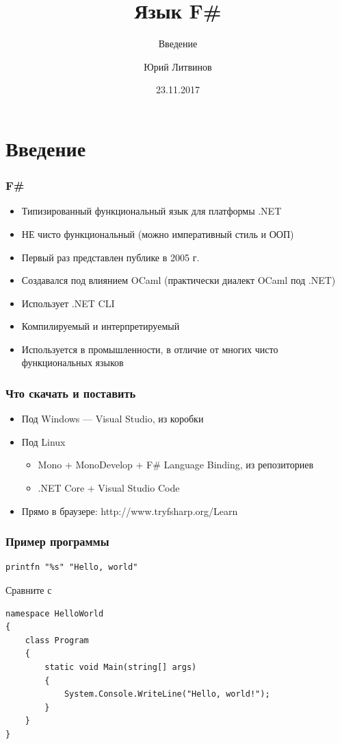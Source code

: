 \documentclass[xetex,mathserif,serif]{beamer}
\title{Язык F\#}
\subtitle{Введение}
\author{Юрий Литвинов}
\date{23.11.2017}
\begin{document}
	
	\frame{\titlepage}

	\section{Введение}

	\begin{frame}
		\frametitle{F\#}
		\begin{itemize}
			\item Типизированный функциональный язык для платформы .NET
			\item НЕ чисто функциональный (можно императивный стиль и ООП)
			\item Первый раз представлен публике в 2005 г.
			\item Создавался под влиянием OCaml (практически диалект OCaml под .NET)
			\item Использует .NET CLI
			\item Компилируемый и интерпретируемый
			\item Используется в промышленности, в отличие от многих чисто функциональных языков
		\end{itemize}
	\end{frame}

	\begin{frame}
		\frametitle{Что скачать и поставить}
		\begin{itemize}
			\item Под Windows --- Visual Studio, из коробки
			\item Под Linux
			\begin{itemize}
				\item Mono + MonoDevelop + F\# Language Binding, из репозиториев
				\item .NET Core + Visual Studio Code
			\end{itemize}
			\item Прямо в браузере: http://www.tryfsharp.org/Learn
		\end{itemize}
	\end{frame}
	
	\begin{frame}[fragile]
		\frametitle{Пример программы}
		\begin{verbatim}
printfn "%s" "Hello, world"
		\end{verbatim}
		Сравните с
		\begin{verbatim}
namespace HelloWorld
{
    class Program
    {
        static void Main(string[] args)
        {
            System.Console.WriteLine("Hello, world!");
        }
    }
}
		\end{verbatim}
\end{frame}
\end{document}

